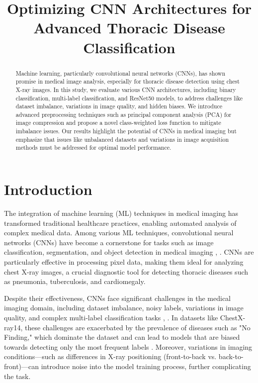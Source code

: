 \documentclass[conference]{IEEEtran}
\begin{document}
\title{Optimizing CNN Architectures for Advanced Thoracic Disease Classification}

\author{
}

\maketitle

\begin{abstract}
Machine learning, particularly convolutional neural networks (CNNs), has shown promise in medical image analysis, especially for thoracic disease detection using chest X-ray images. In this study, we evaluate various CNN architectures, including binary classification, multi-label classification, and ResNet50 models, to address challenges like dataset imbalance, variations in image quality, and hidden biases. We introduce advanced preprocessing techniques such as principal component analysis (PCA) for image compression and propose a novel class-weighted loss function to mitigate imbalance issues. Our results highlight the potential of CNNs in medical imaging but emphasize that issues like unbalanced datasets and variations in image acquisition methods must be addressed for optimal model performance.
\end{abstract}

\IEEEpeerreviewmaketitle

\section{Introduction}
The integration of machine learning (ML) techniques in medical imaging has transformed traditional healthcare practices, enabling automated analysis of complex medical data. Among various ML techniques, convolutional neural networks (CNNs) have become a cornerstone for tasks such as image classification, segmentation, and object detection in medical imaging \cite{he2016deep}, \cite{rajpurkar2017chexnet}. CNNs are particularly effective in processing pixel data, making them ideal for analyzing chest X-ray images, a crucial diagnostic tool for detecting thoracic diseases such as pneumonia, tuberculosis, and cardiomegaly.

Despite their effectiveness, CNNs face significant challenges in the medical imaging domain, including dataset imbalance, noisy labels, variations in image quality, and complex multi-label classification tasks \cite{sethi2018chestx}, \cite{cichy2016deep}. In datasets like ChestX-ray14, these challenges are exacerbated by the prevalence of diseases such as "No Finding," which dominate the dataset and can lead to models that are biased towards detecting only the most frequent labels \cite{wang2017chestxray14}. Moreover, variations in imaging conditions—such as differences in X-ray positioning (front-to-back vs. back-to-front)—can introduce noise into the model training process, further complicating the task.
\end{document}
